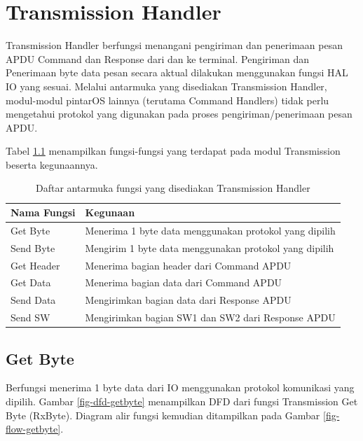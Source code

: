 \chapter{Transmission Handler}
\label{chap_transmission}

Transmission Handler berfungsi menangani pengiriman dan penerimaan pesan APDU Command dan Response dari dan ke terminal. Pengiriman dan Penerimaan byte data pesan secara aktual dilakukan menggunakan fungsi HAL IO yang sesuai. Melalui antarmuka yang disediakan Transmission Handler, modul-modul pintarOS lainnya (terutama Command Handlers) tidak perlu mengetahui protokol yang digunakan pada proses pengiriman/penerimaan pesan APDU.

Tabel \ref{tabel-func-transmission} menampilkan fungsi-fungsi yang terdapat pada modul Transmission beserta kegunaannya.

\begin{table}[h]
  \centering
  \begin{tabular}{|m{5cm}|m{8cm}|}
    \hline
    \bf{Nama Fungsi} & \bf{Kegunaan} \\
    \hline
    Get Byte & Menerima 1 byte data menggunakan protokol yang dipilih \\
    \hline
    Send Byte & Mengirim 1 byte data menggunakan protokol yang dipilih \\
    \hline
    Get Header & Menerima bagian header dari Command APDU \\
    \hline
    Get Data & Menerima bagian data dari Command APDU \\
    \hline
    Send Data & Mengirimkan bagian data dari Response APDU \\
    \hline
    Send SW & Mengirimkan bagian SW1 dan SW2 dari Response APDU \\
    \hline
  \end{tabular}
  \caption{Daftar antarmuka fungsi yang disediakan Transmission Handler}
  \label{tabel-func-transmission}
\end{table}


\section{Get Byte}
\label{sec_getbyte}

Berfungsi menerima 1 byte data dari IO menggunakan protokol komunikasi yang dipilih. Gambar \ref{fig-dfd-getbyte} menampilkan DFD dari fungsi Transmission Get Byte (RxByte). Diagram alir fungsi kemudian ditampilkan pada Gambar \ref{fig-flow-getbyte}. 


